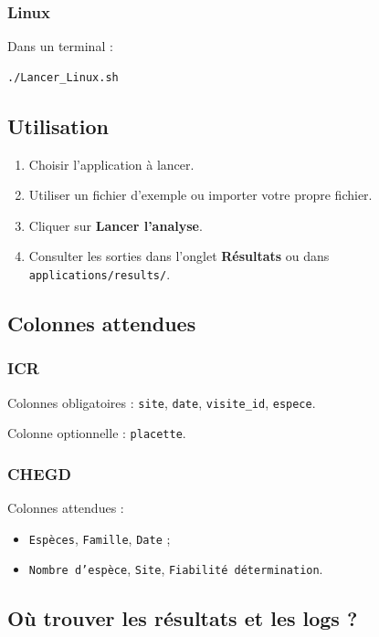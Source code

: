 \documentclass[11pt,a4paper]{article}
\begin{document}
\subsubsection{Linux}
Dans un terminal :
\begin{verbatim}
./Lancer_Linux.sh
\end{verbatim}

\subsection{Utilisation}

\begin{enumerate}
\item Choisir l'application à lancer.
\item Utiliser un fichier d'exemple ou importer votre propre fichier.
\item Cliquer sur \textbf{Lancer l'analyse}.
\item Consulter les sorties dans l'onglet \textbf{Résultats} ou dans \texttt{applications/results/}.
\end{enumerate}

\subsection{Colonnes attendues}

\subsubsection{ICR}
Colonnes obligatoires : \texttt{site}, \texttt{date}, \texttt{visite\_id}, \texttt{espece}.

Colonne optionnelle : \texttt{placette}.

\subsubsection{CHEGD}
Colonnes attendues :
\begin{itemize}
\item \texttt{Espèces}, \texttt{Famille}, \texttt{Date} ;
\item \texttt{Nombre d'espèce}, \texttt{Site}, \texttt{Fiabilité détermination}.
\end{itemize}

\subsection{Où trouver les résultats et les logs ?}
\end{document}
